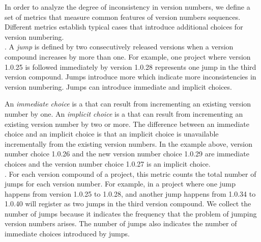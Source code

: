 \documentclass[conference]{IEEEtran}
\begin{document}
In order to analyze the degree of inconsistency in version numbers, we define 
a set of metrics that measure common features of version numbers sequences. Different metrics establish typical cases that introduce additional choices for version numbering. \\
 
 
 
 
. A \emph{jump} is defined by two consecutively released versions when a version compound increases by more than one.
For example, one project where version 1.0.25 is followed immediately by version 1.0.28 represents one jump in the third version compound. 
Jumps introduce more \choices which indicate more inconsistencies in version numbering. 
Jumps can introduce immediate and implicit choices.

An \emph{immediate choice} is a \choice that can result from incrementing an existing version number by one. 
An \emph{implicit choice} is a \choice that can result from incrementing an existing version number by two or more.
The difference between an immediate choice and an implicit choice is that an implicit choice is unavailable incrementally from the existing version numbers. 
In the example above, version number choice 1.0.26 and the new version number choice 1.0.29 are immediate choices and the version number choice 1.0.27 is an implicit choice.
\\
 
.   For each version compound of a project, this metric counts the total number of jumps for each version number. 
 For example, in a project where one jump happens from version 1.0.25 to 1.0.28, and another jump happens from 1.0.34 to 1.0.40 will register as two jumps in the third version compound.
We collect the number of jumps because it indicates the frequency that the problem of jumping version numbers arises. 
The number of jumps also indicates the number of immediate choices introduced by jumps.\\
\end{document}
